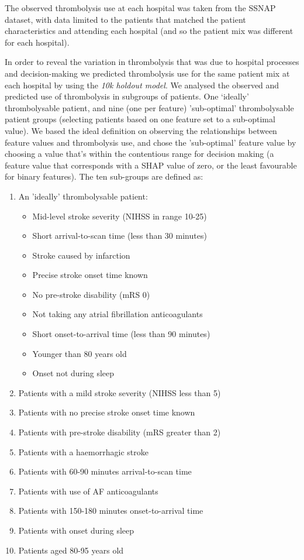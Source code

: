 The observed thrombolysis use at each hospital was taken from the SSNAP dataset, with data limited to the patients that matched the patient characteristics and attending each hospital (and so the patient mix was different for each hospital).

In order to reveal the variation in thrombolysis that was due to hospital processes and decision-making we predicted thrombolysis use for the same patient mix at each hospital by using the \emph{10k holdout model}.
\fi
We analysed the observed and predicted use of thrombolysis in subgroups of patients. One `ideally' thrombolysable patient, and nine (one per feature) 'sub-optimal' thrombolysable patient groups (selecting patients based on one feature set to a sub-optimal value). We based the ideal definition on observing the relationships between feature values and thrombolysis use, and chose the 'sub-optimal' feature value by choosing a value that's within the contentious range for decision making (a feature value that corresponds with a SHAP value of zero, or the least favourable for binary features). The ten sub-groups are defined as:

\begin{enumerate}
  \item An 'ideally' thrombolysable patient:
  \begin{itemize}
    \item Mid-level stroke severity (NIHSS in range 10-25)
    \item Short arrival-to-scan time (less than 30 minutes)
    \item Stroke caused by infarction
    \item Precise stroke onset time known
    \item No pre-stroke disability (mRS 0)
    \item Not taking any atrial fibrillation anticoagulants
    \item Short onset-to-arrival time (less than 90 minutes)
    \item Younger than 80 years old
    \item Onset not during sleep
  \end{itemize}
  \item Patients with a mild stroke severity (NIHSS less than 5)
  \item Patients with no precise stroke onset time known
  \item Patients with pre-stroke disability (mRS greater than 2)
  \item Patients with a haemorrhagic stroke
  \item Patients with 60-90 minutes arrival-to-scan time
  \item Patients with use of AF anticoagulants
  \item Patients with 150-180 minutes onset-to-arrival time
  \item Patients with onset during sleep
  \item Patients aged 80-95 years old
\end{enumerate}

